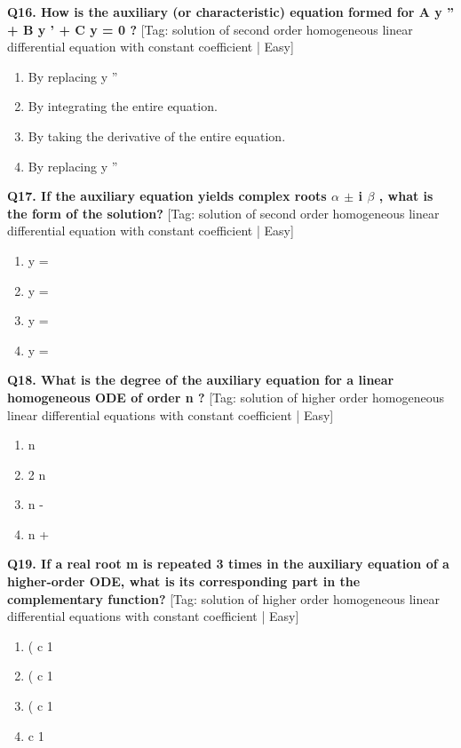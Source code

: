 \noindent\textbf{Q16. How is the auxiliary (or characteristic) equation formed for A y '' + B y ' + C y = 0 ?} \hfill [Tag: solution of second order homogeneous linear differential equation with constant coefficient | Easy]
\begin{enumerate}[label=(\alph*),topsep=2pt,itemsep=1pt,partopsep=0pt,parsep=0pt]
    \item {{By replacing y ''}}
    \item {{By integrating the entire equation.}}
    \item {{By taking the derivative of the entire equation.}}
    \item {{By replacing y ''}}
\end{enumerate}
\vspace{2mm}

\noindent\textbf{Q17. If the auxiliary equation yields complex roots $\alpha$ $\pm$ i $\beta$ , what is the form of the solution?} \hfill [Tag: solution of second order homogeneous linear differential equation with constant coefficient | Easy]
\begin{enumerate}[label=(\alph*),topsep=2pt,itemsep=1pt,partopsep=0pt,parsep=0pt]
    \item {{y =}}
    \item {{y =}}
    \item {{y =}}
    \item {{y =}}
\end{enumerate}
\vspace{2mm}

\noindent\textbf{Q18. What is the degree of the auxiliary equation for a linear homogeneous ODE of order n ?} \hfill [Tag: solution of higher order homogeneous linear differential equations with constant coefficient | Easy]
\begin{enumerate}[label=(\alph*),topsep=2pt,itemsep=1pt,partopsep=0pt,parsep=0pt]
    \item {{n}}
    \item {{2 n}}
    \item {{n -}}
    \item {{n +}}
\end{enumerate}
\vspace{2mm}

\noindent\textbf{Q19. If a real root m is repeated 3 times in the auxiliary equation of a higher-order ODE, what is its corresponding part in the complementary function?} \hfill [Tag: solution of higher order homogeneous linear differential equations with constant coefficient | Easy]
\begin{enumerate}[label=(\alph*),topsep=2pt,itemsep=1pt,partopsep=0pt,parsep=0pt]
    \item {{( c 1}}
    \item {{( c 1}}
    \item {{( c 1}}
    \item {{c 1}}
\end{enumerate}
\vspace{2mm}

